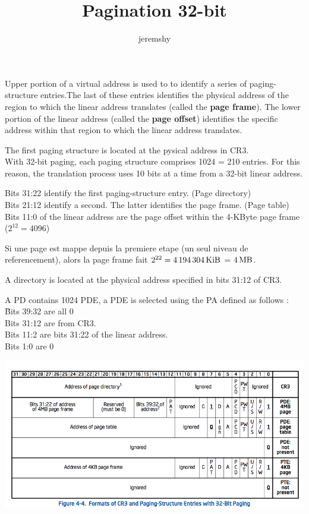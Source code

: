 \documentclass{article}
\begin{document}
\title{Pagination 32-bit}
\author{jeremshy}
\maketitle

Upper portion of a virtual address is used to to identify a series of paging-structure entries.The last of these entries identifies the physical address of the region to which the linear address translates (called the \textbf{page frame}). The lower portion of the linear 	address (called the \textbf{page offset}) identifies the specific address within that region to which the linear address translates.

The first paging structure is located at the pysical address in CR3. \\
With 32-bit paging, each paging structure comprises 1024 = 210 entries. For this reason, the translation process uses 10 bits at a time from a 32-bit linear address.

Bits 31:22 identify the first paging-structure entry. (Page directory)\\
Bits 21:12 identify a second. The latter identifies the page frame. (Page table)\\
Bits 11:0 of the linear address are the page offset within the 4-KByte page frame ($2^{12} = 4096$)

Si une page est mappe depuis la premiere etape (un seul niveau de referencement), alors la page frame fait $2^{22} = \SI{4194304}{\kibi\byte}$ = $\SI{4}{\mega\byte}$.

A directory is located at the physical address specified in bits 31:12 of CR3.

\begin{tabbing}
A PD contains 1024 PDE, a PDE is selected using the PA defined as follows :\\
\hspace{1cm}\=Bits 39:32 are all 0\\
\>Bits 31:12 are from CR3.\\
\>Bits 11:2 are bits 31:22 of the linear address.\\
\>Bits 1:0 are 0\\
\end{tabbing}

\flushleft\includegraphics[scale=0.55]{cr3_graph.png}
\end{document}
